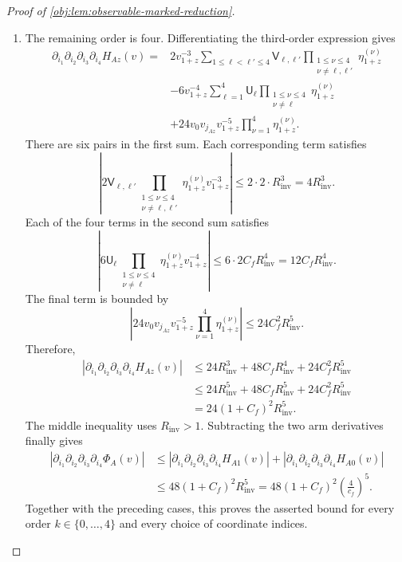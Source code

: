 \begin{proof}[Proof of \cref{obj:lem:observable-marked-reduction}]
\begin{enumerate}
\item The remaining order is four. Differentiating the third-order expression gives
\[
\begin{aligned}
\partial_{i_1}\partial_{i_2}\partial_{i_3}\partial_{i_4}H_{Az}(v)
={}&
2v_{1+z}^{-3}
\sum_{1\le\ell<\ell'\le4}
\mathsf V_{\ell,\ell'}
\prod_{\substack{1\le\nu\le4\\\nu\ne\ell,\ell'}}
\eta^{(\nu)}_{1+z}\\
&-6v_{1+z}^{-4}
\sum_{\ell=1}^4
\mathsf U_\ell
\prod_{\substack{1\le\nu\le4\\\nu\ne\ell}}
\eta^{(\nu)}_{1+z}\\
&+24v_0v_{j_{Az}}v_{1+z}^{-5}
\prod_{\nu=1}^4\eta^{(\nu)}_{1+z}.
\end{aligned}
\]
There are six pairs in the first sum. Each corresponding term satisfies
\[
\left|
2\mathsf V_{\ell,\ell'}
\prod_{\substack{1\le\nu\le4\\\nu\ne\ell,\ell'}}
\eta^{(\nu)}_{1+z}v_{1+z}^{-3}
\right|
\le2\cdot2\cdot R_{\mathrm{inv}}^3
=4R_{\mathrm{inv}}^3.
\]
Each of the four terms in the second sum satisfies
\[
\left|
6\mathsf U_\ell
\prod_{\substack{1\le\nu\le4\\\nu\ne\ell}}
\eta^{(\nu)}_{1+z}v_{1+z}^{-4}
\right|
\le6\cdot2C_fR_{\mathrm{inv}}^4
=12C_fR_{\mathrm{inv}}^4.
\]
The final term is bounded by
\[
\left|
24v_0v_{j_{Az}}v_{1+z}^{-5}
\prod_{\nu=1}^4\eta^{(\nu)}_{1+z}
\right|
\le24C_f^2R_{\mathrm{inv}}^5.
\]
Therefore,
\[
\begin{aligned}
|\partial_{i_1}\partial_{i_2}\partial_{i_3}\partial_{i_4}H_{Az}(v)|
&\le24R_{\mathrm{inv}}^3
    +48C_fR_{\mathrm{inv}}^4
    +24C_f^2R_{\mathrm{inv}}^5\\
&\le24R_{\mathrm{inv}}^5
    +48C_fR_{\mathrm{inv}}^5
    +24C_f^2R_{\mathrm{inv}}^5\\
&=24(1+C_f)^2R_{\mathrm{inv}}^5.
\end{aligned}
\]
The middle inequality uses \(R_{\mathrm{inv}}>1\). Subtracting the two arm derivatives finally gives
\[
\begin{aligned}
|\partial_{i_1}\partial_{i_2}\partial_{i_3}\partial_{i_4}\Phi_A(v)|
&\le
|\partial_{i_1}\partial_{i_2}\partial_{i_3}\partial_{i_4}H_{A1}(v)|
+
|\partial_{i_1}\partial_{i_2}\partial_{i_3}\partial_{i_4}H_{A0}(v)|\\
&\le48(1+C_f)^2R_{\mathrm{inv}}^5
=48(1+C_f)^2\left(\frac4{c_f}\right)^5.
\end{aligned}
\]
Together with the preceding cases, this proves the asserted bound for every order \(k\in\{0,\ldots,4\}\) and every choice of coordinate indices.
\end{enumerate}
\end{proof}
